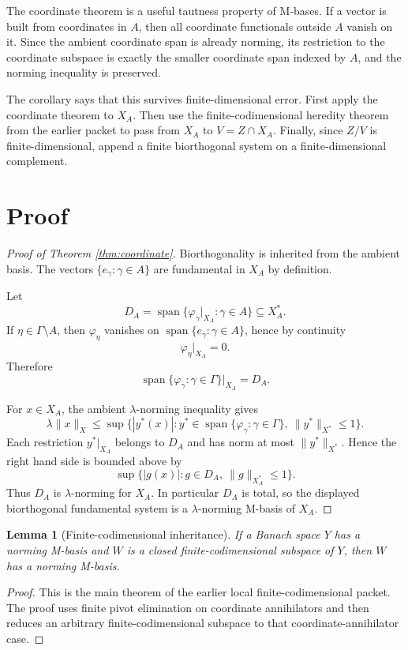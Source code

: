 \documentclass[11pt]{article}
\newtheorem{lemma}{Lemma}
\newcommand{\spn}{\operatorname{span}}
\begin{document}
The coordinate theorem is a useful tautness property of M-bases. If a vector
is built from coordinates in $A$, then all coordinate functionals outside $A$
vanish on it. Since the ambient coordinate span is already norming, its
restriction to the coordinate subspace is exactly the smaller coordinate span
indexed by $A$, and the norming inequality is preserved.

The corollary says that this survives finite-dimensional error. First apply
the coordinate theorem to $X_A$. Then use the finite-codimensional heredity
theorem from the earlier packet to pass from $X_A$ to $V=Z\cap X_A$. Finally,
since $Z/V$ is finite-dimensional, append a finite biorthogonal system on a
finite-dimensional complement.

\section*{Proof}

\begin{proof}[Proof of Theorem \ref{thm:coordinate}]
Biorthogonality is inherited from the ambient basis. The vectors
$\{e_\gamma:\gamma\in A\}$ are fundamental in $X_A$ by definition.

Let
\[
    D_A=\spn\{\varphi_\gamma|_{X_A}:\gamma\in A\}\subseteq X_A^* .
\]
If $\eta\in\Gamma\setminus A$, then $\varphi_\eta$ vanishes on
$\spn\{e_\gamma:\gamma\in A\}$, hence by continuity
\[
    \varphi_\eta|_{X_A}=0.
\]
Therefore
\[
    \spn\{\varphi_\gamma:\gamma\in\Gamma\}|_{X_A}=D_A .
\]

For $x\in X_A$, the ambient $\lambda$-norming inequality gives
\[
 \lambda\|x\|_X
 \le
 \sup\{ |y^*(x)|: y^*\in \spn\{\varphi_\gamma:\gamma\in\Gamma\},
                  \ \|y^*\|_{X^*}\le 1\}.
\]
Each restriction $y^*|_{X_A}$ belongs to $D_A$ and has norm at most
$\|y^*\|_{X^*}$. Hence the right hand side is bounded above by
\[
 \sup\{ |g(x)|: g\in D_A,\ \|g\|_{X_A^*}\le 1\}.
\]
Thus $D_A$ is $\lambda$-norming for $X_A$. In particular $D_A$ is total, so
the displayed biorthogonal fundamental system is a $\lambda$-norming
M-basis of $X_A$.
\end{proof}

\begin{lemma}[Finite-codimensional inheritance]\label{lem:finite-codim}
If a Banach space $Y$ has a norming M-basis and $W$ is a closed
finite-codimensional subspace of $Y$, then $W$ has a norming M-basis.
\end{lemma}

\begin{proof}
This is the main theorem of the earlier local finite-codimensional packet.
The proof uses finite pivot elimination on coordinate annihilators and then
reduces an arbitrary finite-codimensional subspace to that
coordinate-annihilator case.
\end{proof}
\end{document}
